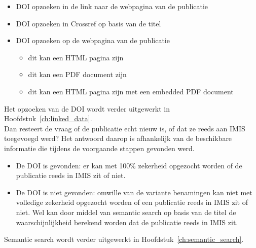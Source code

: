 \begin{itemize}
    \item DOI opzoeken in de link naar de webpagina van de publicatie
    \item DOI opzoeken in Crossref op basis van de titel
    \item DOI opzoeken op de webpagina van de publicatie
    \begin{itemize}
        \item dit kan een HTML pagina zijn
        \item dit kan een PDF document zijn
        \item dit kan een HTML pagina zijn met een embedded PDF document
    \end{itemize}
\end{itemize}
Het opzoeken van de DOI wordt verder uitgewerkt in Hoofdstuk~\ref{ch:linked_data}.\\
Dan resteert de vraag of de publicatie echt nieuw is, of dat ze reeds aan IMIS toegevoegd werd? Het antwoord daarop is afhankelijk van de beschikbare informatie die tijdens de voorgaande stappen gevonden werd.
\begin{itemize}
    \item De DOI is gevonden: er kan met 100\% zekerheid opgezocht worden of de publicatie reeds in IMIS zit of niet.
    \item De DOI is niet gevonden: omwille van de variante benamingen kan niet met volledige zekerheid opgezocht worden of een publicatie reeds in IMIS zit of niet. Wel kan door middel van semantic search op basis van de titel de waarschijnlijkheid berekend worden dat de publicatie reeds in IMIS zit.
\end{itemize}
Semantic search wordt verder uitgewerkt in Hoofdstuk~\ref{ch:semantic_search}.




